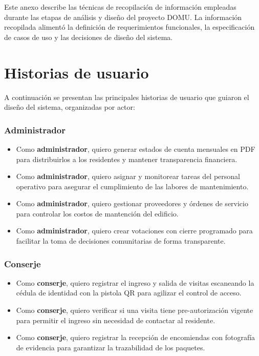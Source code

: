 
Este anexo describe las técnicas de recopilación de información empleadas durante las etapas de análisis y diseño del proyecto DOMU. La información recopilada alimentó la definición de requerimientos funcionales, la especificación de casos de uso y las decisiones de diseño del sistema.

\section{Historias de usuario}

A continuación se presentan las principales historias de usuario que guiaron el diseño del sistema, organizadas por actor:

\subsubsection*{Administrador}
\begin{itemize}
  \item Como \textbf{administrador}, quiero generar estados de cuenta mensuales en PDF para distribuirlos a los residentes y mantener transparencia financiera.
  \item Como \textbf{administrador}, quiero asignar y monitorear tareas del personal operativo para asegurar el cumplimiento de las labores de mantenimiento.
  \item Como \textbf{administrador}, quiero gestionar proveedores y órdenes de servicio para controlar los costos de mantención del edificio.
  \item Como \textbf{administrador}, quiero crear votaciones con cierre programado para facilitar la toma de decisiones comunitarias de forma transparente.
\end{itemize}

\subsubsection*{Conserje}
\begin{itemize}
  \item Como \textbf{conserje}, quiero registrar el ingreso y salida de visitas escaneando la cédula de identidad con la pistola QR para agilizar el control de acceso.
  \item Como \textbf{conserje}, quiero verificar si una visita tiene pre-autorización vigente para permitir el ingreso sin necesidad de contactar al residente.
  \item Como \textbf{conserje}, quiero registrar la recepción de encomiendas con fotografía de evidencia para garantizar la trazabilidad de los paquetes.
\end{itemize}

